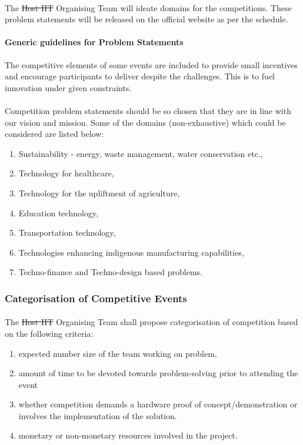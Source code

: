\paragraph{}
The \st{Host IIT} Organising Team will ideate domains for the competitions. These problem statements will be released on the official website as per the schedule. 

\paragraph{Generic guidelines for Problem Statements} 
The competitive elements of some events are included to provide small incentives and encourage participants to deliver despite the challenges. This is to fuel innovation under given constraints.

\paragraph{}
Competition problem statements should be so chosen that they are in line with our vision and mission. Some of the domains (non-exhaustive) which could be considered are listed below:

\begin{enumerate}
    \item Sustainability - energy, waste management, water conservation etc.,
    \item Technology for healthcare,
    \item Technology for the upliftment of agriculture,
    \item Education technology,
    \item Transportation technology,
    \item Technologies enhancing indigenous manufacturing capabilities,
    \item Techno-finance and Techno-design based problems.
\end{enumerate}

\subsubsection{Categorisation of Competitive Events}
\paragraph{}
The \st{Host IIT} Organising Team shall propose categorisation of competition based on the following criteria:
\begin{enumerate}
    \item expected number size of the team working on problem,
    \item amount of time to be devoted towards problem-solving prior to attending the event
    \item whether competition demands a hardware proof of concept/demonstration or involves the implementation of the solution.
    \item monetary or non-monetary resources involved in the project.
\end{enumerate}

